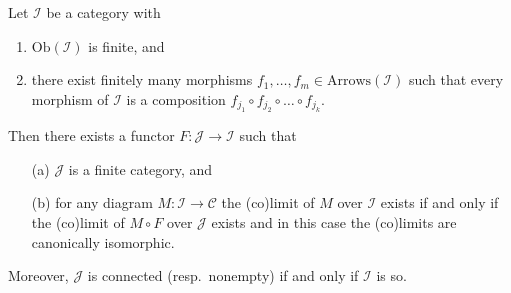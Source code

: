 \begin{lemma}
\label{lemma-finite-diagram-category}
Let $\mathcal{I}$ be a category with
\begin{enumerate}
\item $\text{Ob}(\mathcal{I})$ is finite, and
\item there exist finitely many morphisms
$f_1, \ldots, f_m \in \text{Arrows}(\mathcal{I})$ such
that every morphism of $\mathcal{I}$ is a composition
$f_{j_1} \circ f_{j_2} \circ \ldots \circ f_{j_k}$.
\end{enumerate}
Then there exists a functor $F : \mathcal{J} \to \mathcal{I}$
such that
\begin{enumerate}
\item[(a)] $\mathcal{J}$ is a finite category, and
\item[(b)] for any diagram $M : \mathcal{I} \to \mathcal{C}$ the
(co)limit of $M$ over $\mathcal{I}$ exists if and only if
the (co)limit of $M \circ F$ over $\mathcal{J}$ exists and in this case
the (co)limits are canonically isomorphic.
\end{enumerate}
Moreover, $\mathcal{J}$ is connected (resp.\ nonempty) if and only if
$\mathcal{I}$ is so.
\end{lemma}

